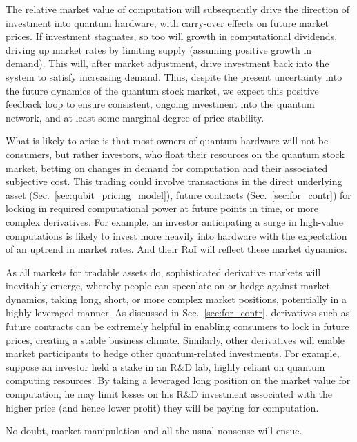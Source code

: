 The relative market value of computation will subsequently drive the direction of investment into quantum hardware, with carry-over effects on future market prices. If investment stagnates, so too will growth in computational dividends, driving up market rates by limiting supply (assuming positive growth in demand). This will, after market adjustment, drive investment back into the system to satisfy increasing demand. Thus, despite the present uncertainty into the future dynamics of the quantum stock market, we expect this positive feedback loop to ensure consistent, ongoing investment into the quantum network, and at least some marginal degree of price stability.

What is likely to arise is that most owners of quantum hardware will not be consumers, but rather investors, who float their resources on the quantum stock market, betting on changes in demand for computation and their associated subjective cost. This trading could involve transactions in the direct underlying asset (Sec.~\ref{sec:qubit_pricing_model}), future contracts (Sec.~\ref{sec:for_contr}) for locking in required computational power at future points in time, or more complex derivatives. For example, an investor anticipating a surge in high-value computations is likely to invest more heavily into hardware with the expectation of an uptrend in market rates. And their RoI will reflect these market dynamics.

As all markets for tradable assets do, sophisticated derivative markets will inevitably emerge, whereby people can speculate on or hedge against market dynamics, taking long, short, or more complex market positions, potentially in a highly-leveraged manner. As discussed in Sec.~\ref{sec:for_contr}, derivatives such as future contracts can be extremely helpful in enabling consumers to lock in future prices, creating a stable business climate. Similarly, other derivatives will enable market participants to hedge other quantum-related investments. For example, suppose an investor held a stake in an R\&D lab, highly reliant on quantum computing resources. By taking a leveraged long position on the market value for computation, he may limit losses on his R\&D investment associated with the higher price (and hence lower profit) they will be paying for computation.

No doubt, market manipulation and all the usual nonsense will ensue.

%
%

